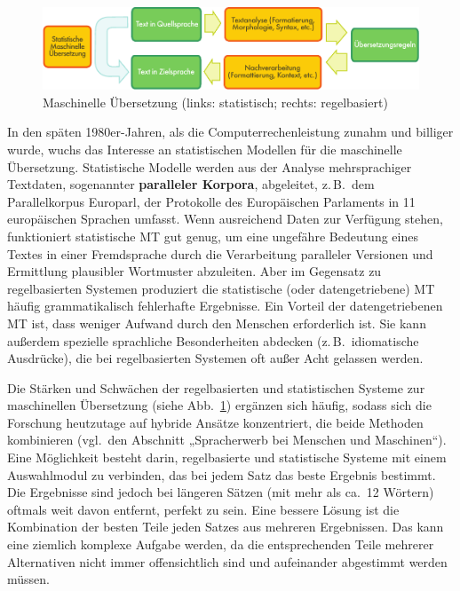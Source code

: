 \documentclass[]{../../metanetpaper}
\begin{document}
\begin{multicols}{2}
\begin{figure}[htb]
  \vspace{-21mm}
  \center
  \includegraphics[width=\textwidth]{../_media/german/machine_translation}
  \vspace{-2mm}
  \caption{Maschinelle Übersetzung (links: statistisch; rechts: regelbasiert)}
  \label{fig:mtarch_de}
\end{figure}

In den späten 1980er-Jahren, als die Computerrechenleistung zunahm und billiger wurde, wuchs das Interesse an statistischen Modellen für die maschinelle Übersetzung. Statistische Modelle werden aus der Analyse mehrsprachiger Textdaten, sogenannter \textbf{paralleler Korpora}, abgeleitet, z.\,B.~dem Parallelkorpus Europarl, der Protokolle des Europäischen Parlaments in 11 europäischen Sprachen umfasst. Wenn ausreichend Daten zur Verfügung stehen, funktioniert statistische MT gut genug, um eine ungefähre Bedeutung eines Textes in einer Fremdsprache durch die Verarbeitung paralleler Versionen und Ermittlung plausibler Wortmuster abzuleiten. Aber im Gegensatz zu regelbasierten Systemen produziert die statistische (oder datengetriebene) MT häufig grammatikalisch fehlerhafte Ergebnisse. Ein Vorteil der datengetriebenen MT ist, dass weniger Aufwand durch den Menschen erforderlich ist. Sie kann außerdem spezielle sprachliche Besonderheiten abdecken (z.\,B.~idiomatische Ausdrücke), die bei regelbasierten Systemen oft außer Acht gelassen werden.

Die Stärken und Schwächen der regelbasierten und statistischen Systeme zur maschinellen Übersetzung (siehe Abb.~\ref{fig:mtarch_de}) ergänzen sich häufig, sodass sich die Forschung heutzutage auf hybride Ansätze konzentriert, die beide Methoden kombinieren (vgl.~den Abschnitt „Spracherwerb bei Menschen und Maschinen“). Eine Möglichkeit besteht darin, regelbasierte und statistische Systeme mit einem Auswahlmodul zu verbinden, das bei jedem Satz das beste Ergebnis bestimmt. Die Ergebnisse sind jedoch bei längeren Sätzen (mit mehr als ca.~12 Wörtern) oftmals weit davon entfernt, perfekt zu sein. Eine bessere Lösung ist die Kombination der besten Teile jeden Satzes aus mehreren Ergebnissen. Das kann eine ziemlich komplexe Aufgabe werden, da die entsprechenden Teile mehrerer Alternativen nicht immer offensichtlich sind und aufeinander abgestimmt werden müssen. 


\end{multicols}
\end{document}
